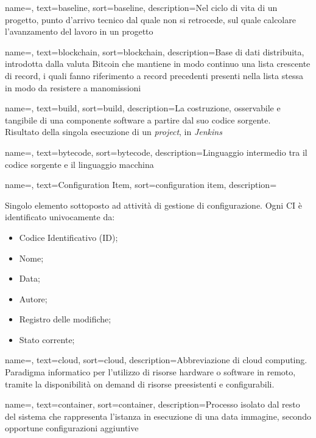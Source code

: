 {
    name=,
    text=baseline,
    sort=baseline,
    description={Nel ciclo di vita di un progetto, punto d'arrivo tecnico dal quale non si retrocede, sul quale calcolare l'avanzamento del lavoro in un progetto}
}

{
    name=,
    text=blockchain,
    sort=blockchain,
    description={Base di dati distribuita, introdotta dalla valuta Bitcoin che mantiene in modo continuo una lista crescente di record, i quali fanno riferimento a record precedenti presenti nella lista stessa in modo da resistere a manomissioni}
}

{
    name=,
    text=build,
    sort=build,
    description={La costruzione, osservabile e tangibile di una componente software a partire dal suo codice sorgente.\\ 
    Risultato della singola esecuzione di un \textit{project}, in \textit{Jenkins}}
}

{
    name=,
    text=bytecode,
    sort=bytecode,
    description={Linguaggio intermedio tra il codice sorgente e il linguaggio macchina}
}

{
    name=,
    text=Configuration Item,
    sort=configuration item,
    description={Singolo elemento sottoposto ad attività di gestione di configurazione. Ogni CI è identificato univocamente da:
        \begin{itemize}
            \item Codice Identificativo (ID);
            \item Nome;
            \item Data;
            \item Autore;
            \item Registro delle modifiche;
            \item Stato corrente;
        \end{itemize}}
}

{
    name=,
    text=cloud,
    sort=cloud,
    description={Abbreviazione di cloud computing. Paradigma informatico per l'utilizzo di risorse hardware o software in remoto, tramite la disponibilità on demand di risorse preesistenti e configurabili.}
}

{
    name=,
    text=container,
    sort=container,
    description={Processo isolato dal resto del sistema che rappresenta l'istanza in esecuzione di una data immagine, secondo opportune configurazioni aggiuntive}
}

